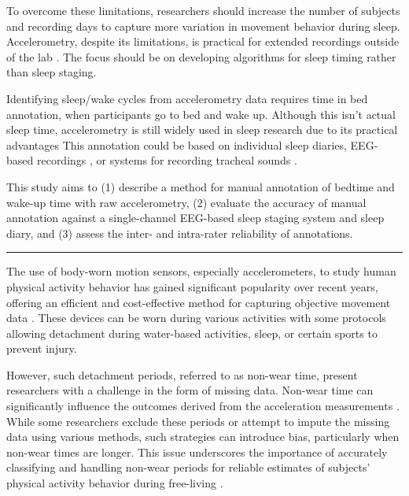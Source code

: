 \documentclass[
  10pt,
  letterpaper,
  DIV=11,
  numbers=noendperiod]{scrartcl}
\begin{document}
To overcome these limitations, researchers should increase the number of
subjects and recording days to capture more variation in movement
behavior during sleep. Accelerometry, despite its limitations, is
practical for extended recordings outside of the lab
\autocite{van_de_water_objective_2011}. The focus should be on
developing algorithms for sleep timing rather than sleep staging.

Identifying sleep/wake cycles from accelerometry data requires time in
bed annotation, when participants go to bed and wake up. Although this
isn't actual sleep time, accelerometry is still widely used in sleep
research due to its practical advantages
\autocite{hees_novel_2015,madsen_actigraphy_2013,schwab_actigraphy_2018,barouni_ambulatory_2020}
This annotation could be based on individual sleep diaries, EEG-based
recordings \autocite{younes_staging_2016}, or systems for recording
tracheal sounds
\autocite{dafna_sleep-wake_2015,montazeri_ghahjaverestan_sleepwakefulness_2020}.

This study aims to (1) describe a method for manual annotation of
bedtime and wake-up time with raw accelerometry, (2) evaluate the
accuracy of manual annotation against a single-channel EEG-based sleep
staging system and sleep diary, and (3) assess the inter- and
intra-rater reliability of annotations.

\begin{center}\rule{0.5\linewidth}{0.5pt}\end{center}

The use of body-worn motion sensors, especially accelerometers, to study
human physical activity behavior has gained significant popularity over
recent years, offering an efficient and cost-effective method for
capturing objective movement data
\autocite{dowd_systematic_2018,loyen_sedentary_2017,montoye_raw_2018,migueles_comparability_2019}.
These devices can be worn during various activities with some protocols
allowing detachment during water-based activities, sleep, or certain
sports to prevent injury.

However, such detachment periods, referred to as non-wear time, present
researchers with a challenge in the form of missing data. Non-wear time
can significantly influence the outcomes derived from the acceleration
measurements \autocite{lee_missing_2018}. While some researchers exclude
these periods or attempt to impute the missing data using various
methods, such strategies can introduce bias, particularly when non-wear
times are longer. This issue underscores the importance of accurately
classifying and handling non-wear periods for reliable estimates of
subjects' physical activity behavior during free-living
\autocite{lee_missing_2018}.
\end{document}
